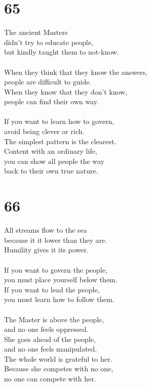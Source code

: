 \documentclass[b5paper, 12pt, oneside]{book}
\begin{document}
\chapter*{65}
The ancient Masters\\
didn't try to educate people,\\
but kindly taught them to not-know.\\
\\
When they think that they know the answers,\\
people are difficult to guide.\\
When they know that they don't know,\\
people can find their own way.\\
\\
If you want to learn how to govern,\\
avoid being clever or rich.\\
The simplest pattern is the clearest.\\
Content with an ordinary life,\\
you can show all people the way\\
back to their own true nature.

\chapter*{66}
All streams flow to the sea\\
because it it lower than they are.\\
Humility gives it its power.\\
\\
If you want to govern the people,\\
you must place yourself below them.\\
If you want to lead the people,\\
you must learn how to follow them.\\
\\
The Master is above the people,\\
and no one feels oppressed.\\
She goes ahead of the people,\\
and no one feels manipulated.\\
The whole world is grateful to her.\\
Because she competes with no one,\\
no one can compete with her.
\end{document}
